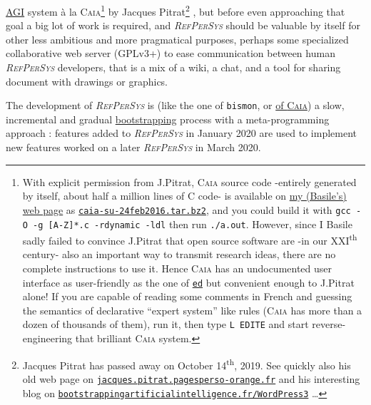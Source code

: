 \documentclass[11pt,a4paper,svgnames]{article}
\newcommand{\RefPerSys}{{\textit{\textsc{RefPerSys}}}}
\begin{document}
\href{https://en.wikipedia.org/wiki/Artificial_general_intelligence}{AGI}
system à la \textsc{Caia}\footnote{With explicit permission from
J.Pitrat, \textsc{Caia} source code -entirely generated by itself,
about half a million lines of C code- is available on
\href{http://starynkevitch.net/Basile/}{my (Basile's) web page} as
\href{http://starynkevitch.net/Basile/caia-su-24feb2016.tar.bz2}{\texttt{caia-su-24feb2016.tar.bz2}},
and you could build it with \texttt{gcc -O -g [A-Z]*.c -rdynamic -ldl}
then run \texttt{./a.out}. However, since I Basile sadly failed to
convince J.Pitrat that open source
\cite{Lerner-Tirole:2000:economics-open-source,
  Weber:2004:SuccessOpenSource} software are -in our
XXI\textsuperscript{th} century- also an important way to transmit
research ideas, there are no complete instructions to use it. Hence
\textsc{Caia} has an undocumented user interface as user-friendly as
the one of \href{https://www.gnu.org/software/ed/}{\texttt{ed}} but
convenient enough to J.Pitrat alone! If you are capable of reading
some comments in French and guessing the semantics of declarative
``expert system'' like rules (\textsc{Caia} has more than a dozen of
thousands of them), run it, then type \texttt{L EDITE} and start
reverse-engineering that brilliant \textsc{Caia} system.}  by Jacques
Pitrat\footnote{Jacques Pitrat has passed away on October
14\textsuperscript{th}, 2019. See quickly also his old web page on
\href{http://jacques.pitrat.pagesperso-orange.fr/}{\texttt{jacques.pitrat.pagesperso-orange.fr}}
and his interesting blog on
\href{http://bootstrappingartificialintelligence.fr/WordPress3/}{\texttt{bootstrappingartificialintelligence.fr/WordPress3}}
\ldots} \cite{Pitrat:1996:FGCS, Pitrat:2009:AST,
  Pitrat:2009:ArtifBeings}, but before even approaching that goal a
big lot of work is required, and {\RefPerSys} should be valuable by
itself for other less ambitious and more pragmatical purposes, perhaps
some specialized collaborative web server (GPLv3+) to ease
communication between human {\RefPerSys} developers, that is a mix of
a wiki, a chat, and a tool for sharing document with drawings or
graphics.

The development of {\RefPerSys} is (like the one of \texttt{bismon},
or
\href{http://bootstrappingartificialintelligence.fr/WordPress3/?s=CAIA}{of
  \textsc{Caia}}) a slow, incremental and gradual
\href{https://en.wikipedia.org/wiki/Bootstrapping}{bootstrapping}
process with a meta-programming \cite{dormoy:1992:meta,
  hernandez-phillips:2019:debugging-bootstrap} approach : features
added to {\RefPerSys} in January 2020 are used to implement new
features worked on a later {\RefPerSys} in March 2020.
\end{document}
